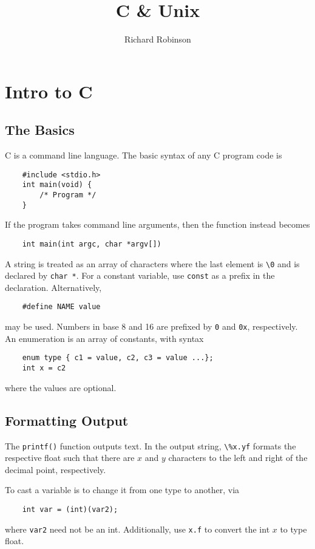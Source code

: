 \documentclass{tufte-book}
\title{C \& Unix}
\author{Richard Robinson}
\begin{document}
\frontmatter
\maketitle
\setlength{\parindent}{0pt}
\mainmatter

\chapter{Intro to C}

\section{The Basics}

C is a command line language. The basic syntax of any C program code is
\begin{lstlisting}
    #include <stdio.h>
    int main(void) {
        /* Program */
    }
\end{lstlisting}
If the program takes command line arguments, then the function instead becomes
\begin{lstlisting}
    int main(int argc, char *argv[])
\end{lstlisting}
A string is treated as an array of characters where the last element is \lstinline{\0} and is declared by \lstinline{char *}. For a constant variable, use \lstinline{const} as a prefix in the declaration. Alternatively,
\begin{lstlisting}
    #define NAME value
\end{lstlisting}
may be used. Numbers in base 8 and 16 are prefixed by \lstinline{0} and \lstinline{0x}, respectively. An enumeration is an array of constants, with syntax
\begin{lstlisting}
    enum type { c1 = value, c2, c3 = value ...};
    int x = c2
\end{lstlisting}
where the values are optional.

\section{Formatting Output}
The \lstinline{printf()} function outputs text.
In the output string, \lstinline{\%x.yf} formats the respective float such that there are $x$ and $y$ characters to the left and right of the decimal point, respectively.

\bigskip
To cast a variable is to change it from one type to another, via
\begin{lstlisting}
    int var = (int)(var2);
\end{lstlisting}
where \lstinline{var2} need not be an int. Additionally, use \lstinline{x.f} to convert the int $x$ to type float.
\end{document}
